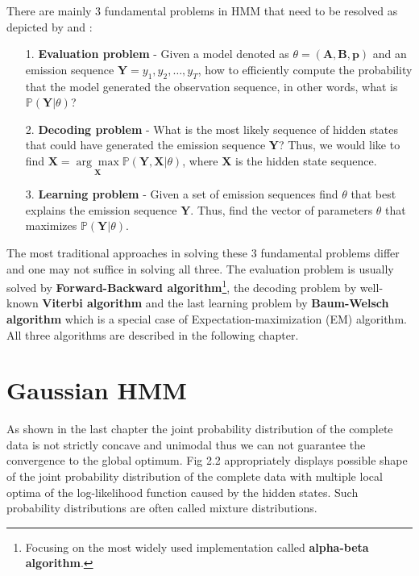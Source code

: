There are mainly 3 fundamental problems in HMM that need to be resolved as depicted by \cite{Oliver2013} and \cite{Ching2005}:
\begin{itemize}
\item[1.] \textbf{Evaluation problem} - Given a model denoted as $\theta = (\textbf{A},\textbf{B},\textbf{p})$ and an emission sequence $\textbf{Y} = y_1, y_2,\ldots,y_T$, how to efficiently compute the probability that the model generated the observation sequence, in other words, what is $\mathbb{P}(\textbf{Y}|\theta)$? 
\item[2.] \textbf{Decoding problem} - What is the most likely sequence of hidden states that could have generated the emission sequence \textbf{Y}? Thus, we would like to find $\textbf{X} = \underset{\textbf{X}}{\arg\max} \mathbb{P}(\textbf{Y},\textbf{X}|\theta)$, where $\textbf{X}$ is the hidden state sequence. 
\item[3.] \textbf{Learning problem} - Given a set of emission sequences find $\theta$ that best explains the emission sequence $\textbf{Y}$. Thus, find the vector of parameters $\theta$ that maximizes $\mathbb{P}(\textbf{Y}|\theta)$. 
\end{itemize}

The most traditional approaches in solving these 3 fundamental problems differ and one may not suffice in solving all three. 
The evaluation problem is usually solved by \textbf{Forward-Backward algorithm}\footnote{Focusing on the most widely used implementation called \textbf{alpha-beta algorithm}.}, the decoding problem by well-known \textbf{Viterbi algorithm} 
and the last learning problem by \textbf{Baum-Welsch algorithm} which is a special case of Expectation-maximization (EM) algorithm.
 All three algorithms are described in the following chapter.

\section{Gaussian HMM}

As shown in the last chapter the joint probability distribution of the complete 
data is not strictly concave and unimodal thus we can not guarantee the convergence to the global optimum.  
Fig 2.2 appropriately displays possible shape of the joint probability distribution of the complete data with multiple 
local optima of the log-likelihood function caused by the hidden states. 
Such probability distributions are often called mixture distributions. 

